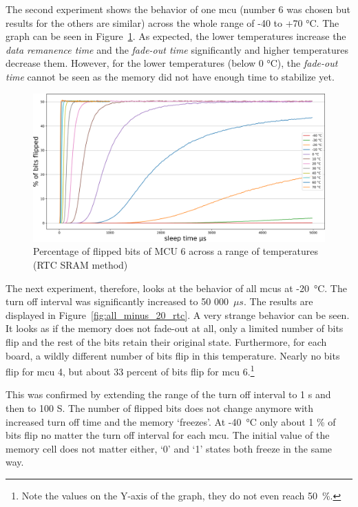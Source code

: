 The second experiment shows the behavior of one \gls{mcu} (number 6 was chosen but results for the others are similar) across the whole range of -40 to +70 °C. The graph can be seen in Figure~\ref{fig:6_across_temps_rtc}. As expected, the lower temperatures increase the \emph{data remanence time} and the \emph{fade-out time} significantly and higher temperatures decrease them. However, for the lower temperatures (below 0 °C), the \emph{fade-out time} cannot be seen as the memory did not have enough time to stabilize yet. 

\begin{figure}[ht!]
    \centering
    \captionsetup{justification=centering,margin=0.5cm}
    \includegraphics[width=\textwidth]{images/6_across_temps_rtc.png}
    \caption{Percentage of flipped bits of MCU 6 across a range of temperatures (RTC SRAM method)}
    \label{fig:6_across_temps_rtc}
\end{figure}

The next experiment, therefore, looks at the behavior of all \glspl{mcu} at -20~°C. The turn off interval was significantly increased to 50 000~$\mu{}s$. The results are displayed in Figure~\ref{fig:all_minus_20_rtc}. A very strange behavior can be seen. It looks as if the memory does not fade-out at all, only a limited number of bits flip and the rest of the bits retain their original state. Furthermore, for each board, a wildly different number of bits flip in this temperature. Nearly no bits flip for \gls{mcu} 4, but about 33 percent of bits flip for \gls{mcu} 6.\footnote{Note the values on the Y-axis of the graph, they do not even reach 50~\%.}

This was confirmed by extending the range of the turn off interval to 1 s and then to 100 S. The number of flipped bits does not change anymore with increased turn off time and the memory `freezes'. At -40~°C only about 1 \% of bits flip no matter the turn off interval for each \gls{mcu}. The initial value of the memory cell does not matter either, `0' and `1' states both freeze in the same way. 

